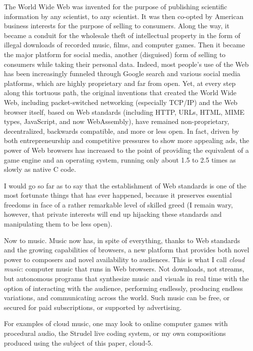 \documentclass[runningheads,a4paper]{llncs}
\begin{document}
The World Wide Web was invented for the purpose of publishing scientific information by any scientist, to any scientist. It was then co-opted by American business interests for the purpose of selling to consumers. Along the way, it became a conduit for the wholesale theft of intellectual property in the form of illegal downloads of recorded music, films, and computer games. Then it became the major platform for social media, another (disguised) form of selling to consumers while taking their personal data. Indeed, most people's use of the Web has been increasingly funneled through Google search and various social media platforms, which are highly proprietary and far from open. Yet, at every step along this tortuous path, the original inventions that created the World Wide Web, including packet-switched networking (especially TCP/IP) and the Web browser itself, based on  Web standards (including HTTP, URLs, HTML, MIME types, JavaScript, and now WebAssembly), have remained non-proprietary, decentralized, backwards compatible, and more or less open. In fact, driven by both entrepreneurship and competitive pressures to show more appealing ads, the power of Web browsers has increased to the point of providing the equivalent of a game engine and an operating system, running only about 1.5 to 2.5  times as slowly as native C code.

I would go so far as to say that the establishment of Web standards is one of the most fortunate things that has ever happened, because it preserves essential freedoms in face of a rather remarkable level of skilled greed (I remain wary, however, that private interests will end up hijacking these standards and manipulating them to be less open).

Now to music. Music now has, in spite of everything, thanks to Web standards and the growing capabilities of browsers, a new platform that provides both novel power to composers and novel availability to audiences. This is what I call \emph{cloud music}: computer music that runs in Web browsers. Not downloads, not streams, but autonomous programs that synthesize music and visuals in real time with the option of interacting with the audience, performing endlessly, producing endless variations, and communicating across the world. Such music can be free, or secured for paid subscriptions, or supported by advertising.

For examples of cloud music, one may look to online computer games with procedural audio, the Strudel live coding system, or my own compositions produced using the subject of this paper, cloud-5.
\end{document}

